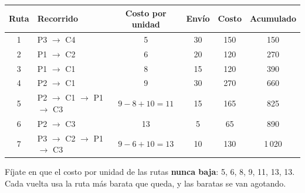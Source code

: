 \documentclass[11pt,a4paper]{article}
\newcommand{\ra}{\ensuremath{\to}}
\begin{document}
\begin{center}\small
\begin{tabular}{clcccc}
\toprule
\textbf{Ruta} & \textbf{Recorrido} & \textbf{Costo por unidad} & \textbf{Envío} & \textbf{Costo} & \textbf{Acumulado} \\
\midrule
1 & P3 \ra{} C4 & 5 & 30 & 150 & 150 \\
2 & P1 \ra{} C2 & 6 & 20 & 120 & 270 \\
3 & P1 \ra{} C1 & 8 & 15 & 120 & 390 \\
4 & P2 \ra{} C1 & 9 & 30 & 270 & 660 \\
5 & P2 \ra{} C1 \ra{} P1 \ra{} C3 & $9 - 8 + 10 = 11$ & 15 & 165 & 825 \\
6 & P2 \ra{} C3 & 13 & 5 & 65 & 890 \\
7 & P3 \ra{} C2 \ra{} P1 \ra{} C3 & $9 - 6 + 10 = 13$ & 10 & 130 & 1\,020 \\
\bottomrule
\end{tabular}
\end{center}
Fíjate en que el costo por unidad de las rutas \textbf{nunca baja}: 5, 6, 8, 9, 11, 13, 13. Cada vuelta usa la ruta más
barata que queda, y las baratas se van agotando.
\end{document}
